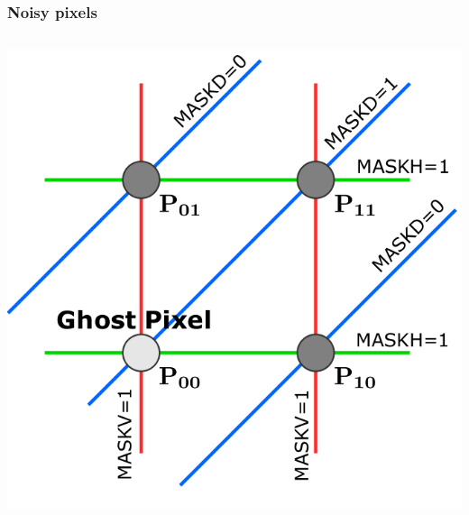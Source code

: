     \begin{frame}[noframenumbering]
        \frametitle{Noisy pixels}
        \begin{columns}
                \centering
                \includegraphics[width=.8\linewidth]{figures/Monopix1/masking_scheme.png}        
        \end{columns}
    \end{frame}    




